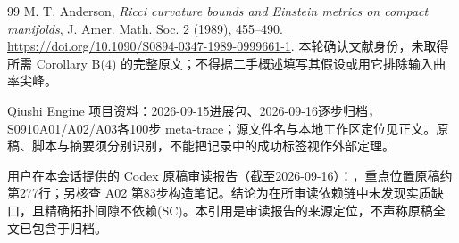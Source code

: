 \documentclass[UTF8,a4paper,11pt,fontset=fandol]{ctexart}
\numberwithin{equation}{section}
\theoremstyle{definition}
\begin{document}
\begin{thebibliography}{99}
 M. T. Anderson, \emph{Ricci curvature bounds and Einstein metrics on compact manifolds}, J. Amer. Math. Soc. 2 (1989), 455--490. \url{https://doi.org/10.1090/S0894-0347-1989-0999661-1}. 本轮确认文献身份，未取得所需 Corollary B(4) 的完整原文；不得据二手概述填写其假设或用它排除输入曲率尖峰。

 Qiushi Engine 项目资料：2026-09-15进展包、2026-09-16逐步归档，S0910A01/A02/A03各100步 meta-trace；源文件名与本地工作区定位见正文。原稿、脚本与摘要须分别识别，不能把记录中的成功标签视作外部定理。

 用户在本会话提供的 Codex 原稿审读报告（截至2026-09-16）：，重点位置原稿约第277行；另核查 A02 第83步构造笔记。结论为在所审读依赖链中未发现实质缺口，且精确拓扑间隙不依赖(SC)。本引用是审读报告的来源定位，不声称原稿全文已包含于归档。

\end{thebibliography}
\end{document}

